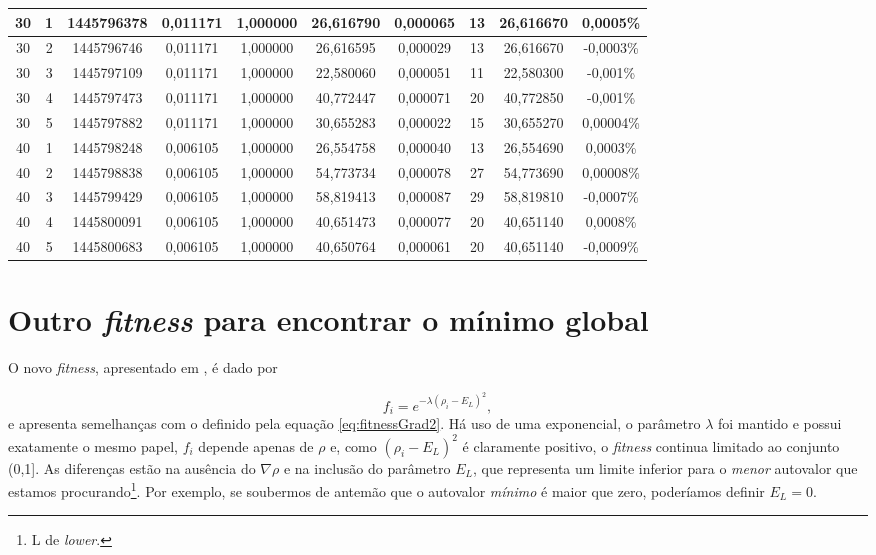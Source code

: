 \begin{landscape}
\begin{center}
\begin{table}[htbp]
\begin{tabular}{cccccccccc}
\hline
        30 &          1 & 1445796378 &   0,011171 &   1,000000 &  26,616790 &   0,000065 &         13 &  26,616670 &   0,0005\% \\
\hline
        30 &          2 & 1445796746 &   0,011171 &   1,000000 &  26,616595 &   0,000029 &         13 &  26,616670 &  -0,0003\% \\
\hline
        30 &          3 & 1445797109 &   0,011171 &   1,000000 &  22,580060 &   0,000051 &         11 &  22,580300 &   -0,001\% \\
\hline
        30 &          4 & 1445797473 &   0,011171 &   1,000000 &  40,772447 &   0,000071 &         20 &  40,772850 &   -0,001\% \\
\hline
        30 &          5 & 1445797882 &   0,011171 &   1,000000 &  30,655283 &   0,000022 &         15 &  30,655270 &  0,00004\% \\
\hline
        40 &          1 & 1445798248 &   0,006105 &   1,000000 &  26,554758 &   0,000040 &         13 &  26,554690 &   0,0003\% \\
\hline
        40 &          2 & 1445798838 &   0,006105 &   1,000000 &  54,773734 &   0,000078 &         27 &  54,773690 &  0,00008\% \\
\hline
        40 &          3 & 1445799429 &   0,006105 &   1,000000 &  58,819413 &   0,000087 &         29 &  58,819810 &  -0,0007\% \\
\hline
        40 &          4 & 1445800091 &   0,006105 &   1,000000 &  40,651473 &   0,000077 &         20 &  40,651140 &   0,0008\% \\
\hline
        40 &          5 & 1445800683 &   0,006105 &   1,000000 &  40,650764 &   0,000061 &         20 &  40,651140 &  -0,0009\% \\
\hline \hline
\end{tabular}
\end{table}  
\end{center}
\end{landscape}

\section{Outro \textit{fitness} para encontrar o mínimo global}

	O novo \textit{fitness}, apresentado em \cite{metodo2011}, é dado por
	
	\begin{equation}\label{eq:fitnessRho0}
		f_i = e^{-\lambda(\rho_i - E_L)^2},
	\end{equation}
e apresenta semelhanças com o definido pela equação \ref{eq:fitnessGrad2}. Há uso de uma exponencial, o parâmetro $\lambda$ foi mantido e possui exatamente o mesmo papel, $f_i$ depende apenas de $\rho$ e, como $(\rho_i - E_L)^2$ é claramente positivo, o \textit{fitness} continua limitado ao conjunto (0,1]. As diferenças estão na ausência do $\nabla \rho$ e na inclusão do parâmetro $E_L$, que representa um limite inferior para o \textit{menor} autovalor que estamos procurando\footnote{L de \textit{lower}.}. Por exemplo, se soubermos de antemão que o autovalor \textit{mínimo} é maior que zero, poderíamos definir $E_L = 0$. 

